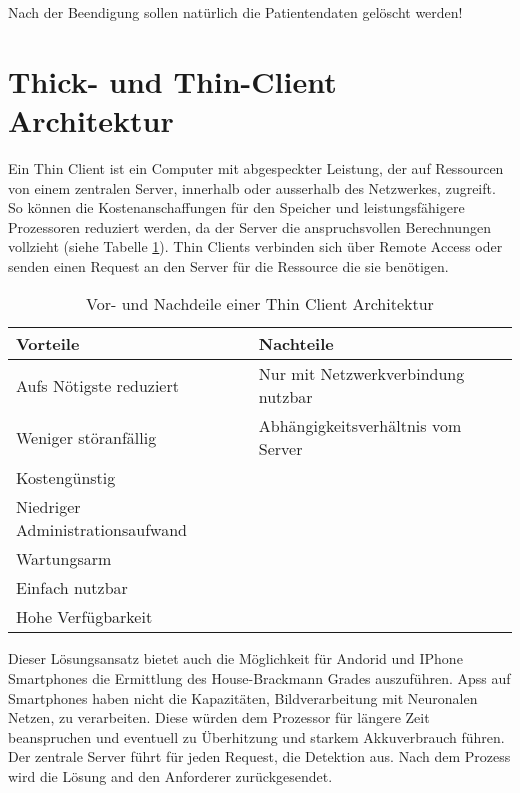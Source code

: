 Nach der Beendigung sollen natürlich die Patientendaten gelöscht werden!

\section{Thick- und Thin-Client Architektur}\label{client}
Ein Thin Client ist ein Computer mit abgespeckter Leistung, der auf Ressourcen von einem zentralen Server, innerhalb oder ausserhalb des Netzwerkes, zugreift. So können die Kostenanschaffungen für den Speicher und leistungsfähigere Prozessoren reduziert werden, da der Server die anspruchsvollen Berechnungen vollzieht (siehe Tabelle \ref{cap:thinclient}). Thin Clients verbinden sich über Remote Access oder senden einen Request an den Server für die Ressource die sie benötigen.

\begin{table}[h]\vspace{1ex}\centering
  \begin{tabular*}{14cm}{l|l}
  \textbf{Vorteile} & \textbf{Nachteile}
  \\\hline
  Aufs Nötigste reduziert          & Nur mit Netzwerkverbindung nutzbar   \\
  Weniger störanfällig             & Abhängigkeitsverhältnis vom Server   \\
  Kostengünstig                    &                                      \\
  Niedriger Administrationsaufwand &                                      \\
  Wartungsarm                      &                                      \\
  Einfach nutzbar                  &                                      \\
  Hohe Verfügbarkeit               &
  \\\hline
  \end{tabular*}
  \caption[Vor- und Nachteile von Thin Client]{Vor- und Nachdeile einer Thin Client Architektur}\label{cap:thinclient}
\vspace{2ex}\end{table}\label{table:thinclient}

Dieser Lösungsansatz bietet auch die Möglichkeit für Andorid und IPhone Smartphones die Ermittlung des House-Brackmann Grades auszuführen. Apss auf Smartphones haben nicht die Kapazitäten, Bildverarbeitung mit Neuronalen Netzen, zu verarbeiten. Diese würden dem Prozessor für längere Zeit beanspruchen und eventuell zu Überhitzung und starkem Akkuverbrauch führen. Der zentrale Server führt für jeden Request, die Detektion aus. Nach dem Prozess wird die Lösung and den Anforderer zurückgesendet.

